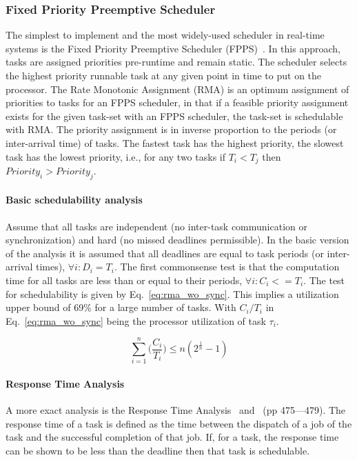 \subsubsection{Fixed Priority Preemptive Scheduler}
The simplest to implement and the most widely-used scheduler in
real-time systems is the Fixed Priority Preemptive Scheduler
(FPPS)~\cite{liu@jacm73, sha@rts04, audsley@rtoss91}. In this
approach, tasks are assigned priorities pre-runtime and remain
static. The scheduler selects the highest priority runnable task at
any given point in time to put on the processor. The Rate Monotonic
Assignment (RMA) is an optimum assignment of priorities to tasks for
an FPPS scheduler, in that if a feasible priority assignment exists
for the given task-set with an FPPS scheduler, the task-set is
schedulable with RMA. The priority assignment is in inverse proportion
to the periods (or inter-arrival time) of tasks. The fastest task has
the highest priority, the slowest task has the lowest priority, i.e.,
for any two tasks if $T_i < T_j$ then $Priority_i > Priority_j$.

\paragraph{Basic schedulability analysis}
Assume that all tasks are independent (no inter-task communication or
synchronization) and hard (no missed deadlines permissible). In the
basic version of the analysis it is assumed that all deadlines are
equal to task periods (or inter-arrival times), $\forall i:D_i =
T_i$. The first commonsense test is that the computation time for all
tasks are less than or equal to their periods, $\forall i:C_i <=
T_i$. The test for schedulability is given by
Eq.~\ref{eq:rma_wo_sync}. This implies a utilization upper bound of
69\% for a large number of tasks. With $C_i/T_i$ in
Eq.~\ref{eq:rma_wo_sync} being the processor utilization of task
$\tau_i$.

\begin{equation}
\label{eq:rma_wo_sync}
\sum_{i=1}^n \bigg(\frac{C_i}{T_i}\bigg) \le n(2^{\frac{1}{n}}-1)
\end{equation}

\paragraph{Response Time Analysis}
A more exact analysis is the Response Time
Analysis~\cite{joseph@tcj86} and~\cite{burns-rtspl} (pp
475---479). The response time of a task is defined as the time between
the dispatch of a job of the task and the successful completion of
that job. If, for a task, the response time can be shown to be less
than the deadline then that task is schedulable.

